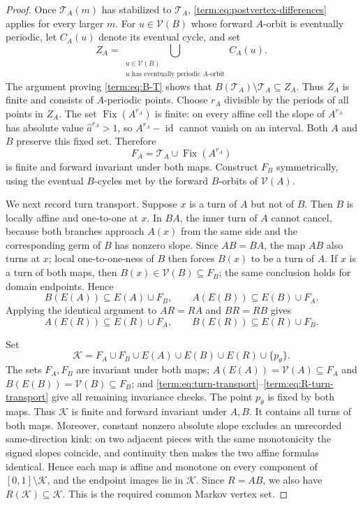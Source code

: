 \documentclass[11pt]{article}
\theoremstyle{definition}
\theoremstyle{remark}
\newcommand{\I}{[0,1]}
\newcommand{\Fix}{\operatorname{Fix}}
\newcommand{\id}{\operatorname{id}}
\begin{document}
\begin{proof}
Once $\mathcal T_A(m)$ has stabilized to $\mathcal T_A$,
\eqref{term:eq:postvertex-differences} applies for every larger $m$.  For
$u\in\mathcal V(B)$ whose forward $A$-orbit is eventually periodic, let
$C_A(u)$ denote its eventual cycle, and set
\[
 Z_A=\bigcup_{\substack{u\in\mathcal V(B)\\
                 u\text{ has eventually periodic }A\text{-orbit}}}C_A(u).
\]
The argument proving \eqref{term:eq:B-T} shows that
$B(\mathcal T_A)\setminus\mathcal T_A\subseteq Z_A$.  Thus $Z_A$ is finite
and consists of $A$-periodic points.  Choose $r_A$ divisible by the periods
of all points in $Z_A$.  The set
$\Fix(A^{r_A})$ is finite: on every affine cell the slope of $A^{r_A}$ has
absolute value $\widehat a^{r_A}>1$, so $A^{r_A}-\id$ cannot vanish on an
interval.  Both $A$ and $B$ preserve this fixed set.  Therefore
\[
 F_A=\mathcal T_A\cup\Fix(A^{r_A})
\]
is finite and forward invariant under both maps.  Construct $F_B$
symmetrically, using the eventual $B$-cycles met by the forward $B$-orbits
of $\mathcal V(A)$.

We next record turn transport.  Suppose $x$ is a turn of $A$ but not of $B$.
Then $B$ is locally affine and one-to-one at $x$.  In $BA$, the inner turn of
$A$ cannot cancel, because both branches approach $A(x)$ from the same side
and the corresponding germ of $B$ has nonzero slope.  Since $AB=BA$, the map
$AB$ also turns at $x$; local one-to-one-ness of $B$ then forces $B(x)$ to be
a turn of $A$.  If $x$ is a turn of both maps, then
$B(x)\in\mathcal V(B)\subseteq F_B$; the same conclusion holds for domain
endpoints.  Hence
\begin{equation}\label{term:eq:turn-transport}
 B(E(A))\subseteq E(A)\cup F_B,\qquad
 A(E(B))\subseteq E(B)\cup F_A.
\end{equation}
Applying the identical argument to $AR=RA$ and $BR=RB$ gives
\begin{equation}\label{term:eq:R-turn-transport}
 A(E(R))\subseteq E(R)\cup F_A,\qquad
 B(E(R))\subseteq E(R)\cup F_B.
\end{equation}

Set
\begin{equation}\label{term:eq:Markov-K}
 \mathcal K=
 F_A\cup F_B\cup E(A)\cup E(B)\cup E(R)\cup\{p_\theta\}.
\end{equation}
The sets $F_A,F_B$ are invariant under both maps;
$A(E(A))=\mathcal V(A)\subseteq F_A$ and
$B(E(B))=\mathcal V(B)\subseteq F_B$; and
\eqref{term:eq:turn-transport}--\eqref{term:eq:R-turn-transport} give all
remaining invariance checks.  The point $p_\theta$ is fixed by both maps.
Thus $\mathcal K$ is finite and forward invariant under $A,B$.  It contains
all turns of both maps.  Moreover, constant nonzero absolute slope excludes
an unrecorded same-direction kink: on two adjacent pieces with the same
monotonicity the signed slopes coincide, and continuity then makes the two
affine formulas identical.  Hence each map is affine and monotone on every
component of $\I\setminus\mathcal K$, and the endpoint images lie in
$\mathcal K$.
Since \(R=AB\), we also have \(R(\mathcal K)\subseteq\mathcal K\).
This is the required common Markov vertex set.
\end{proof}
\end{document}

